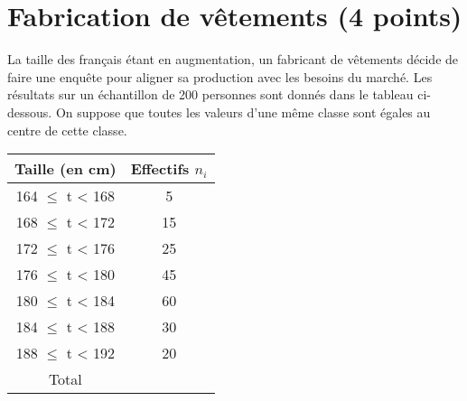 \section{Fabrication de vêtements (4 points)}

La taille des français étant en augmentation, un fabricant de vêtements décide de faire une enquête pour aligner sa production avec les besoins du marché. Les résultats sur un échantillon de 200 personnes sont donnés dans le tableau ci-dessous. On suppose que toutes les valeurs d'une même classe sont égales au centre de cette classe.


\begin{center}
	\begin{tabular}{|@{\ \ }c@{\ \ }|@{\ \ }c@{\ \ }|}
	\hline
	Taille (en cm)     & Effectifs $n_i$ \\ \hline
	164 $\leq$ t < 168 & 5               \\ \hline
	168 $\leq$ t < 172 & 15              \\ \hline
	172 $\leq$ t < 176 & 25              \\ \hline
	176 $\leq$ t < 180 & 45              \\ \hline
	180 $\leq$ t < 184 & 60              \\ \hline
	184 $\leq$ t < 188 & 30              \\ \hline
	188 $\leq$ t < 192 & 20              \\ \hline
	Total              &                 \\ \hline
\end{tabular}
\end{center}


